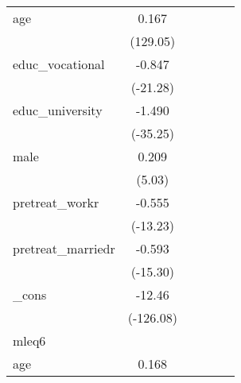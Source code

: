 {\begin{tabular}{l*{5}{c}}
age         &       0.167\sym{***}&                     &                     &                     &                     \\
            &    (129.05)         &                     &                     &                     &                     \\
[1em]
educ\_vocational&      -0.847\sym{***}&                     &                     &                     &                     \\
            &    (-21.28)         &                     &                     &                     &                     \\
[1em]
educ\_university&      -1.490\sym{***}&                     &                     &                     &                     \\
            &    (-35.25)         &                     &                     &                     &                     \\
[1em]
male        &       0.209\sym{***}&                     &                     &                     &                     \\
            &      (5.03)         &                     &                     &                     &                     \\
[1em]
pretreat\_workr&      -0.555\sym{***}&                     &                     &                     &                     \\
            &    (-13.23)         &                     &                     &                     &                     \\
[1em]
pretreat\_marriedr&      -0.593\sym{***}&                     &                     &                     &                     \\
            &    (-15.30)         &                     &                     &                     &                     \\
[1em]
\_cons      &      -12.46\sym{***}&                     &                     &                     &                     \\
            &   (-126.08)         &                     &                     &                     &                     \\
\hline
mleq6       &                     &                     &                     &                     &                     \\
age         &       0.168\sym{***}&                     &                     &                     &                     \\

\end{tabular}}
